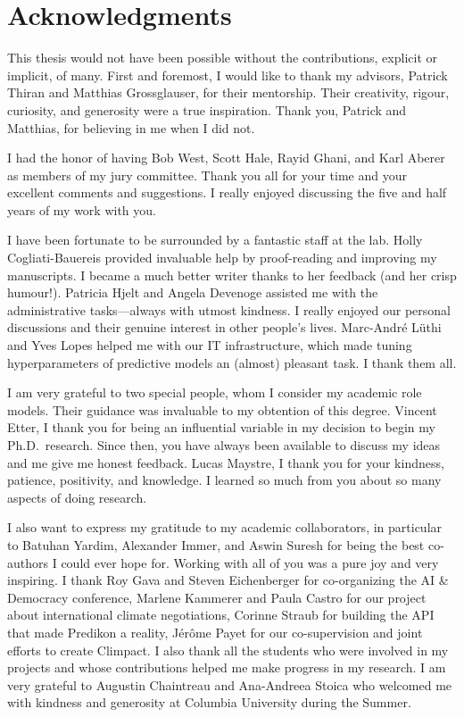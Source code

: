 \chapter*{Acknowledgments}

This thesis would not have been possible without the contributions, explicit or implicit, of many.
First and foremost, I would like to thank my advisors, Patrick Thiran and Matthias Grossglauser, for their mentorship.
Their creativity, rigour, curiosity, and generosity were a true inspiration.
Thank you, Patrick and Matthias, for believing in me when I did not.

I had the honor of having Bob West, Scott Hale, Rayid Ghani, and Karl Aberer as members of my jury committee.
Thank you all for your time and your excellent comments and suggestions.
I really enjoyed discussing the five and half years of my work with you.

I have been fortunate to be surrounded by a fantastic staff at the lab.
Holly Cogliati-Bauereis provided invaluable help by proof-reading and improving my manuscripts.
I became a much better writer thanks to her feedback (and her crisp humour!).
Patricia Hjelt and Angela Devenoge assisted me with the administrative tasks---always with utmost kindness.
I really enjoyed our personal discussions and their genuine interest in other people's lives.
Marc-André Lüthi and Yves Lopes helped me with our IT infrastructure, which made tuning hyperparameters of predictive models an (almost) pleasant task.
I thank them all.

I am very grateful to two special people, whom I consider my academic role models.
Their guidance was invaluable to my obtention of this degree.
Vincent Etter, I thank you for being an influential variable in my decision to begin my Ph.D.\ research.
Since then, you have always been available to discuss my ideas and me give me honest feedback.
Lucas Maystre, I thank you for your kindness, patience, positivity, and knowledge.
I learned so much from you about so many aspects of doing research.

I also want to express my gratitude to my academic collaborators, in particular to Batuhan Yardim, Alexander Immer, and Aswin Suresh for being the best co-authors I could ever hope for.
Working with all of you was a pure joy and very inspiring.
I thank Roy Gava and Steven Eichenberger for co-organizing the AI \& Democracy conference, Marlene Kammerer and Paula Castro for our project about international climate negotiations, Corinne Straub for building the API that made Predikon a reality, Jérôme Payet for our co-supervision and joint efforts to create Climpact.
I also thank all the students who were involved in my projects and whose contributions helped me make progress in my research.
I am very grateful to Augustin Chaintreau and Ana-Andreea Stoica who welcomed me with kindness and generosity at Columbia University during the Summer.


